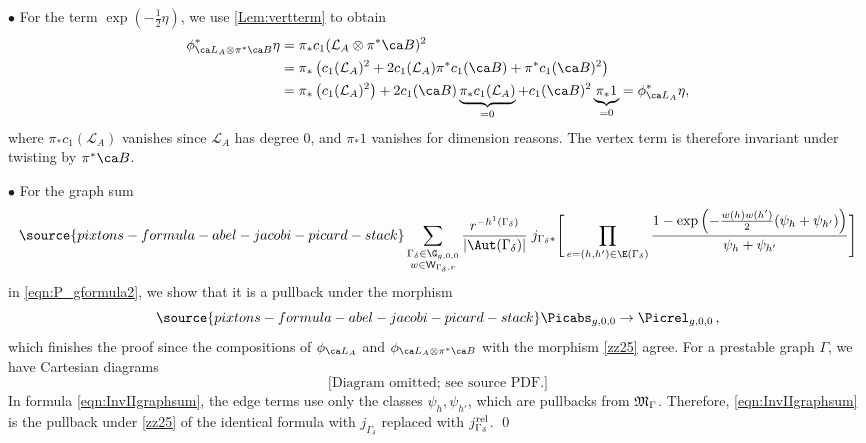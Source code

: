  $\bullet$ For the term $\exp\left(-\frac12 \eta \right)$,  we use \cref{Lem:vertterm} to obtain
\begin{align*}
\phi_{\ca L_A \otimes \pi^* \ca B}^* \eta &= \pi_* c_1( \mathcal{L}_{A} \otimes \pi^* \ca B)^2\\ &= \pi_* \left(c_1( \mathcal{L}_{A})^2 + 2 c_1(\mathcal{L}_{A}) \pi^* c_1(\ca B) + \pi^* c_1(\ca B)^2\right) \\
&= \pi_* \left(c_1( \mathcal{L}_{A})^2\right) + 2 c_1(\ca B) \underbrace{\pi_* c_1(\mathcal{L}_{A})}_{=0}  +  c_1(\ca B)^2 \underbrace{\pi_* 1}_{=0} = \phi_{\ca L_A}^* \eta,
\end{align*}
where
$\pi_* c_1(\mathcal{L}_{A})$
vanishes since $\mathcal{L}_{A}$ has degree $0$, and $\pi_*1$ vanishes for dimension reasons. The vertex term is therefore
invariant under twisting by $\pi^* \ca B$.

 $\bullet$ For the graph sum
\begin{equation} \label{eqn:InvIIgraphsum}
\source{pixtons-formula-abel-jacobi-picard-stack}
\sum_{
\substack{\Gamma_\delta\in \G_{g,0,0} \\
w\in \mathsf{W}_{\Gamma_\delta,r}}
}
\frac{r^{-h^1(\Gamma_\delta)}}{|\Aut(\Gamma_\delta)| }
\;
j_{\Gamma_\delta*}\Bigg[
\prod_{e=(h,h')\in \E(\Gamma_\delta)}
\frac{1-\exp\left(-\frac{w(h)w(h')}2(\psi_h+\psi_{h'})\right)}{\psi_h + \psi_{h'}} \Bigg]
\end{equation}
in \eqref{eqn:P_gformula2}, we show that it is a pullback under the morphism
\begin{equation}\label{zz25}
\source{pixtons-formula-abel-jacobi-picard-stack}
\Picabs_{g,0,0} \to \Picrel_{g,0,0}\, ,
\end{equation}
which finishes the proof since the compositions of $\phi_{\ca L_A}$ and $\phi_{\ca L_A \otimes \pi^* \ca B}$ with the morphism
\eqref{zz25} agree. For a prestable graph $\Gamma$,
we have Cartesian diagrams
\begin{equation}
\text{[Diagram omitted; see source PDF.]}
\end{equation}
In formula  \eqref{eqn:InvIIgraphsum}, the edge terms use only the classes $\psi_h, \psi_{h'}$, which are pullbacks from $\frak M_\Gamma$. Therefore, \eqref{eqn:InvIIgraphsum} is the pullback under \eqref{zz25} of the identical formula with $j_{\Gamma_\delta}$ replaced with $j^\textup{rel}_{\Gamma_\delta}$. \qed


